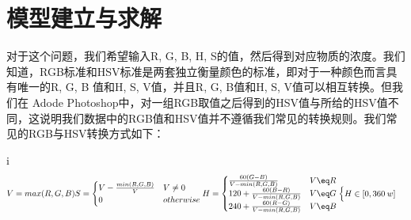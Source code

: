 \section{模型建立与求解}
对于这个问题，我们希望输入R, G, B, H, S的值，然后得到对应物质的浓度。我们知道，RGB标准和HSV标准是两套独立衡量颜色的标准，即对于一种颜色而言具有唯一的R, G, B 值和H, S, V值，并且R, G, B值和H, S, V值可以相互转换。但我们在 Adode Photoshop中，对一组RGB取值之后得到的HSV值与所给的HSV值不同，这说明我们数据中的RGB值和HSV值并不遵循我们常见的转换规则。我们常见的RGB与HSV转换方式如下：

i\begin{displaymath}
\begin{align}
V = max(R, G, B)

S = \begin{cases} 
V - \frac{min(R, G, B)}{V} & V \neq 0 \\
0 & otherwise
\end{cases}

H = \begin{cases}
\frac {60(G-B)} {V-min(R, G, B)} & V \eq R \\
120 + \frac{60(B-R)}{V-min(R,G,B)}  & V \eq G \\ 
240 + \frac{60(R-G)}{V-min(R,G,B)} & V \eq B
\end{cases}

\begin{cases}
H \in [0, 360\:w]
\end{cases}
\end{align}
\end{displaymath}


